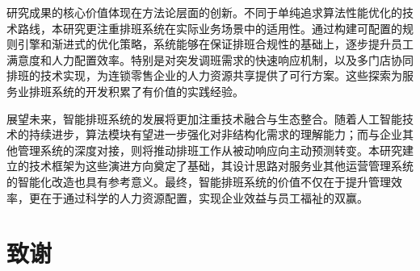 \documentclass{ctexart}
\begin{document}
研究成果的核心价值体现在方法论层面的创新。不同于单纯追求算法性能优化的技术路线，本研究更注重排班系统在实际业务场景中的适用性。通过构建可配置的规则引擎和渐进式的优化策略，系统能够在保证排班合规性的基础上，逐步提升员工满意度和人力配置效率。特别是对突发调班需求的快速响应机制，以及多门店协同排班的技术实现，为连锁零售企业的人力资源共享提供了可行方案。这些探索为服务业排班系统的开发积累了有价值的实践经验。

展望未来，智能排班系统的发展将更加注重技术融合与生态整合。随着人工智能技术的持续进步，算法模块有望进一步强化对非结构化需求的理解能力；而与企业其他管理系统的深度对接，则将推动排班工作从被动响应向主动预测转变。本研究建立的技术框架为这些演进方向奠定了基础，其设计思路对服务业其他运营管理系统的智能化改造也具有参考意义。最终，智能排班系统的价值不仅在于提升管理效率，更在于通过科学的人力资源配置，实现企业效益与员工福祉的双赢。


\section*{致谢}



\end{document}

